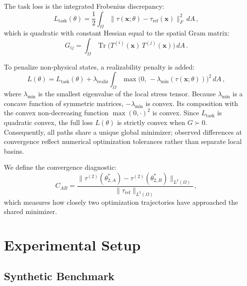 \documentclass[preprint,aps,prb,longbibliography,superscriptaddress]{revtex4-2}
\newcommand{\bx}{\mathbf{x}}
\newcommand{\Tr}{\operatorname{Tr}}
\newcommand{\tref}{\tau_{\text{ref}}}
\begin{document}
The task loss is the integrated Frobenius discrepancy:
\begin{equation}\label{eq:task_loss}
  L_{\text{task}}(\theta) = \frac{1}{2}\int_\Omega
  \|\tau(\bx;\theta) - \tref(\bx)\|_F^2\,dA\,,
\end{equation}
which is quadratic with constant Hessian equal to the spatial Gram matrix:
\begin{equation}\label{eq:gram}
  G_{ij} = \int_\Omega \Tr\bigl(T^{(i)}(\bx)\, T^{(j)}(\bx)\bigr)\,dA\,.
\end{equation}

To penalize non-physical states, a realizability penalty is added:
\begin{equation}\label{eq:penalty}
  L(\theta) = L_{\text{task}}(\theta)
  + \lambda_{\mathrm{realiz}}
    \int_\Omega \max\!\bigl(0,\, -\lambda_{\min}(\tau(\bx;\theta))\bigr)^2\,dA\,,
\end{equation}
where $\lambda_{\min}$ is the smallest eigenvalue of the local stress tensor.
Because $\lambda_{\min}$ is a concave function of symmetric matrices,
$-\lambda_{\min}$ is convex. Its composition with the convex non-decreasing
function $\max(0,\cdot)^2$ is convex. Since $L_{\text{task}}$ is quadratic
convex, the full loss $L(\theta)$ is strictly convex when $G \succ 0$.
Consequently, all paths share a unique global minimizer; observed differences at
convergence reflect numerical optimization tolerances rather than separate
local basins.

We define the convergence diagnostic:
\begin{equation}\label{eq:CAB}
  C_{AB}
  = \frac{\|\tau^{(2)}(\theta_{2,A}^*) -
          \tau^{(2)}(\theta_{2,B}^*)\|_{L^2(\Omega)}}
         {\|\tref\|_{L^2(\Omega)}}\,,
\end{equation}
which measures how closely two optimization trajectories have approached the
shared minimizer.

\section{Experimental Setup}\label{sec:setup}

\subsection{Synthetic Benchmark}\label{sec:benchmark}
\end{document}
